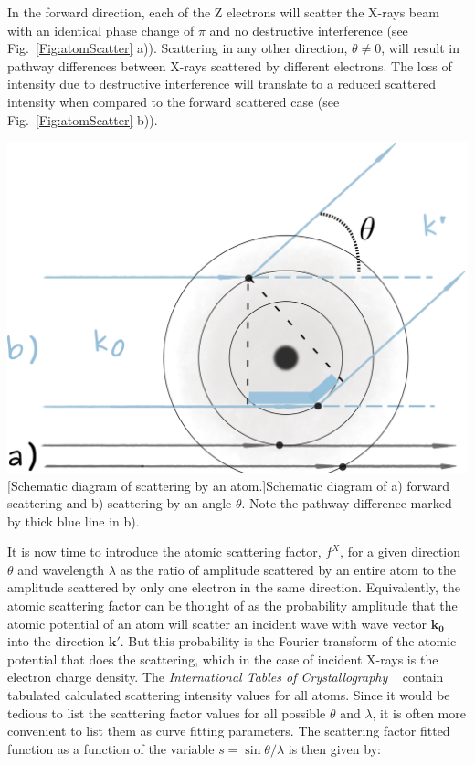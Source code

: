 \noindent \begin{minipage}{0.45\textwidth}
In the forward direction, each of the Z electrons will scatter the X-rays beam with an identical phase change of $\pi$ and no destructive interference (see Fig.~\ref{Fig:atomScatter} a)). Scattering in any other direction, $\theta \neq 0$, will result in pathway differences between X-rays scattered by different electrons. The loss of intensity due to destructive interference will translate to a reduced scattered intensity when compared to the forward scattered case (see Fig.~\ref{Fig:atomScatter} b)).
\end{minipage}
\begin{minipage}{0.55\textwidth}
    \centering
\includegraphics[width=0.7\linewidth]{Figures/atomScatter.png}
[Schematic diagram of scattering by an atom.]{Schematic diagram of a) forward scattering and b) scattering by an angle $\theta$. Note the pathway difference marked by thick blue line in b). }
\label{Fig:atomScatter}
\end{minipage}

\hspace{0.5cm}

It is now time to introduce the atomic scattering factor, $f^X$, for a given direction $\theta$ and wavelength $\lambda$ as the ratio of amplitude scattered by an entire atom to the amplitude scattered by only one electron in the same direction. Equivalently, the atomic scattering factor can be thought of as the probability amplitude that the atomic potential of an atom will scatter an incident wave with wave vector $\mathbf{k_0}$ into the direction $\mathbf{k'}$. But this probability is the Fourier transform of the atomic potential that does the scattering, which in the case of incident X-rays is the electron charge density. The \textit{International Tables of Crystallography} ~\cite{IntTableCrysBX} contain tabulated calculated scattering intensity values for all atoms. Since it would be tedious to list the scattering factor values for all possible $\theta$ and $\lambda$, it is often more convenient to list them as curve fitting parameters. The scattering factor fitted function as a function of the variable $s = \sin{\theta}/\lambda$ is then given by:

